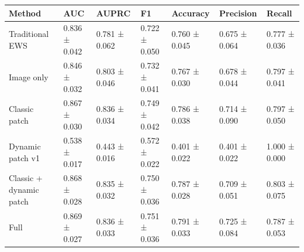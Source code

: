 \begin{tabular}{lllllll}
\toprule
Method & AUC & AUPRC & F1 & Accuracy & Precision & Recall \\
\midrule
Traditional EWS & 0.836 ± 0.042 & 0.781 ± 0.062 & 0.722 ± 0.050 & 0.760 ± 0.045 & 0.675 ± 0.064 & 0.777 ± 0.036 \\
Image only & 0.846 ± 0.032 & 0.803 ± 0.046 & 0.732 ± 0.041 & 0.767 ± 0.030 & 0.678 ± 0.044 & 0.797 ± 0.041 \\
Classic patch & 0.867 ± 0.030 & 0.836 ± 0.034 & 0.749 ± 0.042 & 0.786 ± 0.038 & 0.714 ± 0.090 & 0.797 ± 0.050 \\
Dynamic patch v1 & 0.538 ± 0.017 & 0.443 ± 0.016 & 0.572 ± 0.022 & 0.401 ± 0.022 & 0.401 ± 0.022 & 1.000 ± 0.000 \\
Classic + dynamic patch & 0.868 ± 0.028 & 0.835 ± 0.032 & 0.750 ± 0.036 & 0.787 ± 0.028 & 0.709 ± 0.051 & 0.803 ± 0.075 \\
Full & 0.869 ± 0.027 & 0.836 ± 0.033 & 0.751 ± 0.036 & 0.791 ± 0.033 & 0.725 ± 0.084 & 0.787 ± 0.053 \\
\bottomrule
\end{tabular}

